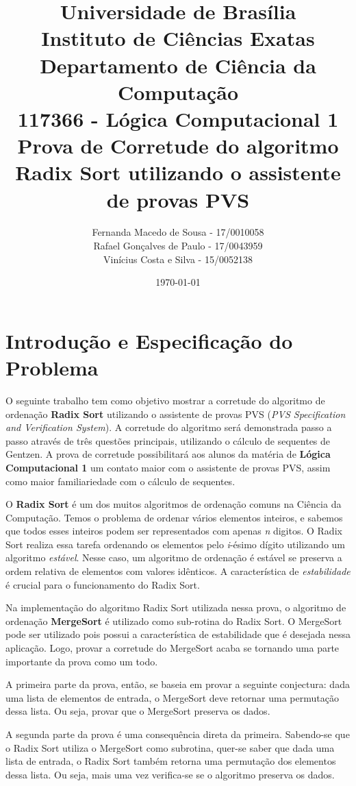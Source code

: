 \documentclass[12pt]{article}
\title{{\large Universidade de Brasília \\ Instituto de Ciências Exatas \\
Departamento de Ciência da Computação} \\[1cm]
117366 - Lógica Computacional 1\\[.5cm]
Prova de Corretude do algoritmo Radix Sort utilizando o assistente de provas PVS}
\author{  Fernanda Macedo de Sousa - 17/0010058  \\
        Rafael Gonçalves de Paulo - 17/0043959 \\
        Vinícius Costa e Silva  - 15/0052138}
\date{\today}
\begin{document}
\maketitle

\section{Introdução e Especificação do Problema}
O seguinte trabalho tem como objetivo mostrar a corretude do algoritmo de ordenação \textbf{Radix Sort} utilizando o assistente de provas PVS (\textit{PVS Specification and Verification System}). A corretude do algoritmo será demonstrada passo a passo através de três questões principais, utilizando o cálculo de sequentes de Gentzen. A prova de corretude possibilitará aos alunos da matéria de \textbf{Lógica Computacional 1} um contato maior com o assistente de provas PVS, assim como maior familiariedade com o cálculo de sequentes.

O \textbf{Radix Sort} é um dos muitos algoritmos de ordenação comuns na Ciência da Computação. Temos o problema de ordenar vários elementos inteiros, e sabemos que todos esses inteiros podem ser representados com apenas \textit{n} digitos. O Radix Sort realiza essa tarefa ordenando os elementos pelo \textit{i}-ésimo dígito utilizando um algoritmo \textit{estável}. Nesse caso, um algoritmo de ordenação é estável se preserva a ordem relativa de elementos com valores idênticos. A característica de \textit{estabilidade} é crucial para o funcionamento do Radix Sort.

Na implementação do algoritmo Radix Sort utilizada nessa prova, o algoritmo de ordenação \textbf{MergeSort} é utilizado como sub-rotina do Radix Sort. O MergeSort pode ser utilizado pois possui a característica de estabilidade que é desejada nessa aplicação. Logo, provar a corretude do MergeSort acaba se tornando uma parte importante da prova como um todo.

A primeira parte da prova, então, se baseia em provar a seguinte conjectura: dada uma lista de elementos de entrada, o MergeSort deve retornar uma permutação dessa lista. Ou seja, provar que o MergeSort preserva os dados.

A segunda parte da prova é uma consequência direta da primeira. Sabendo-se que o Radix Sort utiliza o MergeSort como subrotina, quer-se saber que dada uma lista de entrada, o Radix Sort também retorna uma permutação dos elementos dessa lista. Ou seja, mais uma vez verifica-se se o algoritmo preserva os dados.
\end{document}
